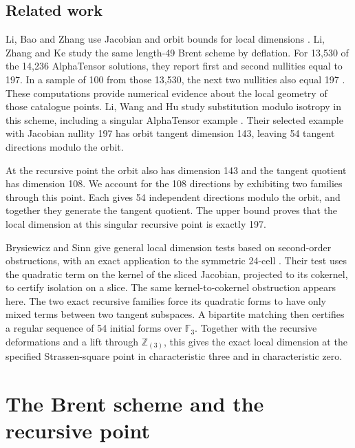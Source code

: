 \documentclass[11pt]{amsart}
\newcommand{\F}{\mathbb F}
\newcommand{\Z}{\mathbb Z}
\begin{document}
\subsection{Related work}

Li, Bao and Zhang use Jacobian and orbit bounds for local dimensions
\cite{lbz}. Li, Zhang and Ke study the same length-49 Brent scheme
by deflation. For 13,530 of the 14,236 AlphaTensor solutions, they
report first and second nullities equal to 197. In a sample of 100
from those 13,530, the next two nullities also equal 197
\cite[Section~5.3]{lzk}. These computations provide numerical
evidence about the local geometry of those catalogue points.
Li, Wang and Hu study substitution modulo isotropy in this scheme,
including a singular AlphaTensor example \cite[Sections~5.2.2
and~5.3]{lwh}. Their selected example with Jacobian nullity 197 has
orbit tangent dimension 143, leaving 54 tangent directions modulo
the orbit.

At the recursive point the orbit also has dimension 143 and the
tangent quotient has dimension 108. We account for the 108 directions
by exhibiting two families through this point. Each gives 54
independent directions modulo the orbit, and together they generate
the tangent quotient. The upper bound proves that the local
dimension at this singular recursive point is exactly 197.

Brysiewicz and Sinn give general local dimension tests based on
second-order obstructions, with an exact application to the
symmetric 24-cell \cite[Sections~2--3 and~5]{bs}. Their test uses
the quadratic term on the kernel of the sliced Jacobian, projected
to its cokernel, to certify isolation on a slice. The same
kernel-to-cokernel obstruction appears here. The two exact
recursive families force its quadratic forms to have only mixed
terms between two tangent subspaces. A bipartite matching then
certifies a regular sequence of 54 initial forms over $\F_3$.
Together with the recursive deformations and a lift through
$\Z_{(3)}$, this gives the exact local dimension at the specified
Strassen-square point in characteristic three and in characteristic
zero.

\section{The Brent scheme and the recursive point}
\end{document}
